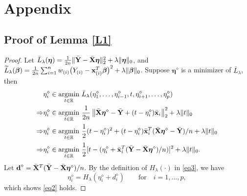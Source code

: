 \documentclass[12pt]{article}
\newcommand{\bX}{{\bf X}}
\newcommand{\bx}{\mbox{\bf x}}
\newcommand{\bd}{\mbox{\bf d}}
\newcommand{\bY}{\mbox{\bf Y}}
\newcommand{\bbeta}{\boldsymbol{\beta}}
\newcommand{\boldeta}{\boldsymbol{\eta}}
\begin{document}
\section*{Appendix}
\begin{appendix}
\section{Proof of Lemma \ref{L1}}
\label{lemma1proof}
\setcounter{equation}{0}
\def\theequation{A.\arabic{equation}}
\begin{proof}
Let $\bar{L}_{\lambda}(\boldeta)=\frac{1}{2n}\|\bar{\bY}-\bar{\bX}\boldeta\|_2^2+\lambda\|\boldeta\|_0$, and
$\widetilde{L}_{\lambda}(\bbeta)=\frac{1}{2n}\sum_{i=1}^{n}w_{(i)}\big{(}Y_{(i)}-\bx^{T}_{(i)}\bbeta\big{)}^2+\lambda\|\bbeta\|_0$.
Suppose $\boldeta^{\diamond}$ is a minimizer of $\bar{L}_{\lambda}$, then
{
\begin{equation*}
\begin{split}
&\eta_{i}^{\diamond}\in \underset{t\in \mathbb{R}}{\mbox{argmin}}~\bar{L}_{\lambda}(\eta^{\diamond}_{1},\ldots,\eta^{\diamond}_{i-1},t,\eta^{\diamond}_{i+1},\ldots,\eta^{\diamond}_{p})\\
\Rightarrow &\eta_{i}^{\diamond}\in \underset{t\in \mathbb{R}}{\mbox{argmin}}~\frac{1}{2n}\left\|\bar{\bX}\boldeta^{\diamond}-\bar{\bY}+(t-\eta^\diamond_{i})\bar{\bx}_{i}\right\|_2^2+\lambda\|t\|_0\\
\Rightarrow &\eta_{i}^{\diamond}\in \underset{t\in \mathbb{R}}{\mbox{argmin}}~\frac{1}{2}(t-\eta^\diamond_{i})^2+(t-\eta^{\diamond}_{i})\bar{\bx}^{T}_{i}(\bar{\bX}\boldeta^{\diamond}-\bar{\bY})/n+\lambda\|t\|_0\\
\Rightarrow &\eta_{i}^{\diamond}\in \underset{t\in \mathbb{R}}{\mbox{argmin}}~\frac{1}{2}[t-(\eta^\diamond_{i}+\bar{\bx}^{T}_{i}(\bar{\bY}-\bar{\bX}\boldeta^{\diamond})/n)]^2+\lambda\|t\|_0.\\
\end{split}
\end{equation*}
}
Let $\bd^{\diamond}=\bar{\bX}^{T}(\bar{\bY}-\bar{\bX}\boldeta^{\diamond})/n$. By the definition of $H_{\lambda}(\cdot)$ in \eqref{eq3}, we have
\begin{equation*}
\eta^{\diamond}_{i}=H_{\lambda}(\eta^{\diamond}_{i}+d^{\diamond}_{i})\quad \quad \mbox{for}\quad i =1,...,p,
\end{equation*}
which shows \eqref{eq2} holds.


\end{proof}
\end{appendix}
\end{document}
